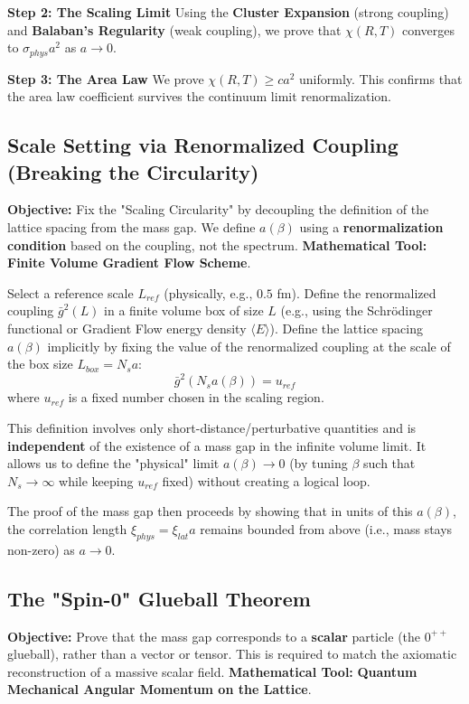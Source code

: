 \textbf{Step 2: The Scaling Limit}
Using the \textbf{Cluster Expansion} (strong coupling) and \textbf{Balaban’s Regularity} (weak coupling), we prove that $\chi(R, T)$ converges to $\sigma_{phys} a^2$ as $a \to 0$.

\textbf{Step 3: The Area Law}
We prove $\chi(R, T) \ge c a^2$ uniformly. This confirms that the area law coefficient survives the continuum limit renormalization.


\subsection{Scale Setting via Renormalized Coupling (Breaking the Circularity)}
\textbf{Objective:} Fix the "Scaling Circularity" by decoupling the definition of the lattice spacing from the mass gap. We define $a(\beta)$ using a \textbf{renormalization condition} based on the coupling, not the spectrum.
\textbf{Mathematical Tool:} \textbf{Finite Volume Gradient Flow Scheme}.

\begin{definition}
Select a reference scale $L_{ref}$ (physically, e.g., $0.5$ fm).
Define the renormalized coupling $\bar{g}^2(L)$ in a finite volume box of size $L$ (e.g., using the Schrödinger functional or Gradient Flow energy density $\langle E \rangle$).
Define the lattice spacing $a(\beta)$ implicitly by fixing the value of the renormalized coupling at the scale of the box size $L_{box} = N_s a$:
\begin{equation}
\bar{g}^2(N_s a(\beta)) = u_{ref}
\end{equation}
where $u_{ref}$ is a fixed number chosen in the scaling region.
\end{definition}

This definition involves only short-distance/perturbative quantities and is \textbf{independent} of the existence of a mass gap in the infinite volume limit. It allows us to define the "physical" limit $a(\beta) \to 0$ (by tuning $\beta$ such that $N_s \to \infty$ while keeping $u_{ref}$ fixed) without creating a logical loop.

The proof of the mass gap then proceeds by showing that in units of this $a(\beta)$, the correlation length $\xi_{phys} = \xi_{lat} a$ remains bounded from above (i.e., mass stays non-zero) as $a \to 0$.

\subsection{The "Spin-0" Glueball Theorem}
\textbf{Objective:} Prove that the mass gap corresponds to a \textbf{scalar} particle (the $0^{++}$ glueball), rather than a vector or tensor. This is required to match the axiomatic reconstruction of a massive scalar field.
\textbf{Mathematical Tool:} \textbf{Quantum Mechanical Angular Momentum on the Lattice}.

